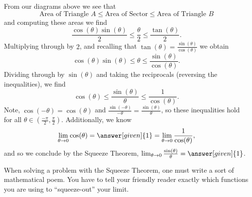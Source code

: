 \documentclass{ximera}
\begin{document}
\begin{example}
\begin{explanation}
From our diagrams above we see that
\[
\text{Area of Triangle $A$} \le \text{Area of Sector} \le \text{Area of Triangle $B$}
\]
and computing these areas we find
\[
\frac{\cos(\theta)\sin(\theta)}{2} \le \frac{\theta}{2} \le \frac{\tan(\theta)}{2}.
\]
Multiplying through by $2$, and recalling that $\tan(\theta) =
\frac{\sin(\theta)}{\cos(\theta)}$ we obtain
\[
\cos(\theta)\sin(\theta) \le \theta \le \frac{\sin(\theta)}{\cos(\theta)}.
\]
Dividing through by $\sin(\theta)$ and taking the reciprocals
(reversing the inequalities), we find
\[
\cos(\theta) \le \frac{\sin(\theta)}{\theta} \le \frac{1}{\cos(\theta)}.
\]
Note, $\cos(-\theta) = \cos(\theta)$ and $\frac{\sin(-\theta)}{-\theta} =
\frac{\sin(\theta)}{\theta}$, so these inequalities hold for all $\theta\in
\left(\frac{-\pi}{2}, \frac{\pi}{2}\right)$.  Additionally, we know
\[
\lim_{\theta \to 0}\cos(\theta) = \answer[given]{1} = \lim_{\theta\to 0}\frac{1}{\cos(\theta)},
\]
and so we conclude by the Squeeze Theorem, $\lim_{\theta \to
  0}\frac{\sin(\theta)}{\theta} = \answer[given]{1}$.
\end{explanation}
\end{example}

When solving a problem with the Squeeze Theorem, one must write a sort
of mathematical poem. You have to tell your friendly reader exactly
which functions you are using to ``squeeze-out'' your limit.
\end{document}
